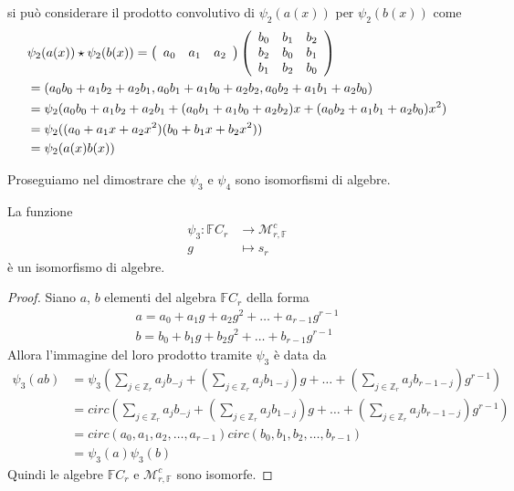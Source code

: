 si può considerare il prodotto convolutivo di $\psi_{2}(a(x))$
per $\psi_{2}(b(x))$ come
\begin{align*}
&\psi_{2}(a(x)) \star \psi_{2}(b(x)) 
=
\left(
\begin{array} {c c c }
a_0 & a_1 & a_2    
\end{array}
\right) 
\left(
\begin{array} {c c c}
b_0 & b_1 & b_2   \\
b_2 & b_0 & b_1   \\
b_1 & b_2 & b_0        
\end{array}
\right) 
\\
&=
(
a_{0}b_{0} + a_{1}b_{2} + a_{2}b_{1}, 
a_{0}b_{1} + a_{1}b_{0} + a_{2}b_{2},
a_{0}b_{2} + a_{1}b_{1} + a_{2}b_{0}
)
\\
&=
\psi_{2}
( 
a_{0}b_{0} + a_{1}b_{2} + a_{2}b_{1} +  
(a_{0}b_{1} + a_{1}b_{0} + a_{2}b_{2})x +
(a_{0}b_{2} + a_{1}b_{1} + a_{2}b_{0})x^2
) 
\\
&=
\psi_{2}((a_{0} + a_{1}x+ a_{2}x^2)(b_{0} + b_{1}x+ b_{2}x^2)) 
\\
&=
\psi_{2}(a(x)b(x))
\end{align*}


Proseguiamo nel dimostrare che $\psi_{3}$ e $\psi_{4}$ sono isomorfismi di
algebre.

\begin{prop}
La funzione
\begin{align*}
\psi_{3}: \mathbb{F}C_{r}
          &\longrightarrow  
          \mathcal{M}_{r,\mathbb{F} }^{c}  \\
              g 
              &\longmapsto 
              s_{r}
\end{align*}
è un isomorfismo di algebre.
\end{prop}

\begin{proof}
Siano $a$, $b$ elementi del algebra $\mathbb{F}C_{r}$ della forma
\begin{align*}
 a = a_0 + a_1 g + a_2 g^2 + \dots + a_{r-1} g^{r-1} 
\\
 b = b_0 + b_1 g + b_2 g^2 + \dots + b_{r-1} g^{r-1}
\end{align*}
Allora l'immagine del loro prodotto tramite $\psi_{3}$ è data da
\begin{align*}
\psi_{3}(ab) 
&= \psi_{3}( 
\sum_{j \in \mathbb{Z}_{r} } a_{j} b_{-j} + 
(\sum_{j \in \mathbb{Z}_{r} } a_{j} b_{1-j})g + 
\dots +
(\sum_{j \in \mathbb{Z}_{r} } a_{j} b_{r-1-j})g^{r-1} )
\\
&= circ
(
\sum_{j \in \mathbb{Z}_{r} } a_{j} b_{-j} + 
(\sum_{j \in \mathbb{Z}_{r} } a_{j} b_{1-j})g + 
\dots +
(\sum_{j \in \mathbb{Z}_{r} } a_{j} b_{r-1-j})g^{r-1}
) 
\\
&=
circ(a_0, a_1, a_2, \dots , a_{r-1})
circ( b_0, b_1, b_2 , \dots , b_{r-1} )
\\
&= \psi_{3}(a) \psi_{3}(b) 
\end{align*}
Quindi le algebre $\mathbb{F}C_{r}$ e 
$\mathcal{M}_{r,\mathbb{F} }^{c}$ sono
isomorfe.
\end{proof}

